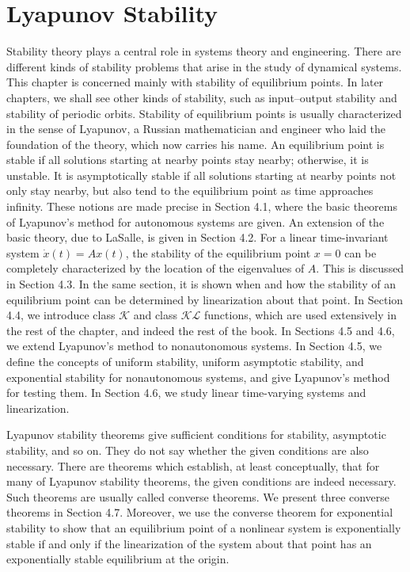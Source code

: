 

\chapter{Lyapunov Stability}


Stability theory plays a central role in systems theory and engineering. There are different kinds of stability problems that arise in the study of dynamical systems. This chapter is concerned mainly with stability of equilibrium points. In later chapters, we shall see other kinds of stability, such as input–output stability and stability of periodic orbits. Stability of equilibrium points is usually characterized in the sense of Lyapunov, a Russian mathematician and engineer who laid the foundation of the theory, which now carries his name. An equilibrium point is stable if all solutions starting at nearby points stay nearby; otherwise, it is unstable. It is asymptotically stable if all solutions starting at nearby points not only stay nearby, but also tend to the equilibrium point as time approaches infinity. These notions are made precise in Section 4.1, where the basic theorems of Lyapunov’s method for autonomous systems are given. An extension of the basic theory, due to LaSalle, is given in Section 4.2. For a linear time-invariant system $\dot{x}(t) = Ax(t)$, the stability of the equilibrium point $x = 0$ can be completely characterized by the location of the eigenvalues of $A$. This is discussed in Section 4.3. In the same section, it is shown when and how the stability of an equilibrium point can be determined by linearization about that point. In Section 4.4, we introduce class $\mathcal{K}$ and class $\mathcal{KL}$ functions, which are used extensively in the rest of the chapter, and indeed the rest of the book. In Sections 4.5 and 4.6, we extend Lyapunov’s method to nonautonomous systems. In Section 4.5, we define the concepts of uniform stability, uniform asymptotic stability, and exponential stability for nonautonomous systems, and give Lyapunov’s method for testing them. In Section 4.6, we study linear time-varying systems and linearization.

Lyapunov stability theorems give sufficient conditions for stability, asymptotic stability, and so on. They do not say whether the given conditions are also necessary. There are theorems which establish, at least conceptually, that for many of Lyapunov stability theorems, the given conditions are indeed necessary. Such theorems are usually called converse theorems. We present three converse theorems in Section 4.7. Moreover, we use the converse theorem for exponential stability to show that an equilibrium point of a nonlinear system is exponentially stable if and only if the linearization of the system about that point has an exponentially stable equilibrium at the origin.


